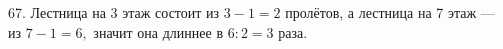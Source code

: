 67. Лестница на 3 этаж состоит из $3-1=2$ пролётов, а лестница на 7 этаж --- из $7-1=6,$ значит она длиннее в $6:2=3$ раза.\\
